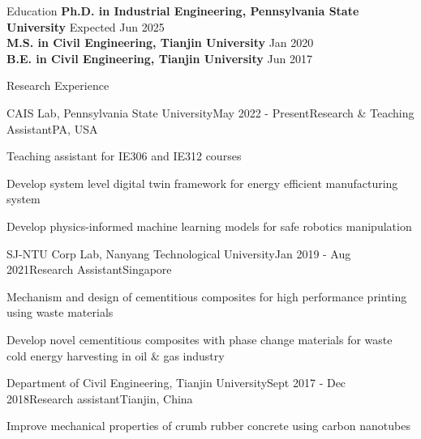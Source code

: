 \documentclass{resume}
\begin{document}

\begin{rSection}{Education}
{\bf Ph.D. in Industrial Engineering, Pennsylvania State University} \hfill {Expected Jun 2025}\\
{\bf M.S. in Civil Engineering, Tianjin University} \hfill {Jan 2020}\\
{\bf B.E. in Civil Engineering, Tianjin University} \hfill {Jun 2017}
\end{rSection}

\begin{rSection}{Research Experience}

\begin{rSubsection}{CAIS Lab, Pennsylvania State University}{May 2022 - Present}{Research \& Teaching Assistant}{PA, USA}
\item Teaching assistant for IE306 and IE312 courses
\item Develop system level digital twin framework for energy efficient manufacturing system
\item Develop physics-informed machine learning models for safe robotics manipulation
\end{rSubsection}
        
\begin{rSubsection}{SJ-NTU Corp Lab, Nanyang Technological University}{Jan 2019 - Aug 2021}{Research Assistant}{Singapore}
\item Mechanism and design of cementitious composites for high performance printing using waste materials
\item Develop novel cementitious composites with phase change materials for waste cold energy harvesting in oil \& gas industry
\end{rSubsection}
        
\begin{rSubsection}{Department of Civil Engineering, Tianjin University}{Sept 2017 - Dec 2018}{Research assistant}{Tianjin, China}
\item Improve mechanical properties of crumb rubber concrete using carbon nanotubes
\end{rSubsection}
        
\end{rSection}
\end{document}
